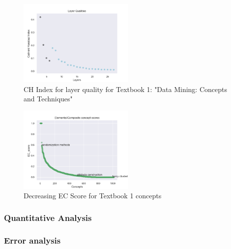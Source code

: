 \begin{figure}[t]
	\includegraphics[width=0.5\textwidth, left]{figures/han_bidi_layer_qual_1.png}
	\caption{CH Index for layer quality for Textbook 1: "Data Mining: Concepts and Techniques"}
	\label{han_layer_qual}
\end{figure}

\begin{figure}[t]
	\includegraphics[width=0.5\textwidth, left]{figures/han_bidi_EC_scores_good1.png}
	\caption{Decreasing EC Score for Textbook 1 concepts}
	\label{han_EC}
\end{figure}

\subsubsection{Quantitative Analysis}\label{quantitative}


\subsubsection{Error analysis}\label{error}

